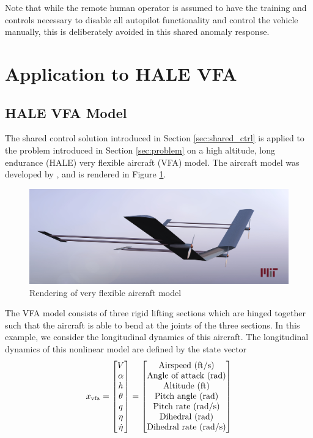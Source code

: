\documentclass[english]{ifacconf}
\begin{document}
Note that while the remote human operator is assumed to have the training and controls necessary to disable all autopilot functionality and control the vehicle manually, this is deliberately avoided in this shared anomaly response. 

\section{Application to HALE VFA} \label{sec:vfa}
\subsection{HALE VFA Model}
The shared control solution introduced in Section \ref{sec:shared_ctrl} is applied to the problem introduced in Section \ref{sec:problem} on a high altitude, long endurance (HALE) very flexible aircraft (VFA) model. The aircraft model was developed by \cite{gibson2011modeling}, and is rendered in Figure \ref{fig:vfa}. 
\begin{figure}[htbp]
	\centering
	\includegraphics[width=0.95\columnwidth]{../fig/VFA_16.jpg}
	\caption{Rendering of very flexible aircraft model}
	\label{fig:vfa}
\end{figure}

The VFA model consists of three rigid lifting sections which are hinged together such that the aircraft is able to bend at the joints of the three sections. In this example, we consider the longitudinal dynamics of this aircraft. The longitudinal dynamics of this nonlinear model are defined by the state vector
\begin{equation}
x_{\text{vfa}} = \begin{bmatrix}
V \\
\alpha \\
h \\
\theta \\
q\\
\eta\\
\dot{\eta}
\end{bmatrix} =
\begin{bmatrix}
	 $Airspeed (ft/s)$\\ $Angle of attack (rad)$\\ $Altitude (ft)$\\ $Pitch angle (rad)$\\ $Pitch rate (rad/s)$\\ $Dihedral (rad)$\\ $Dihedral rate (rad/s)$
\end{bmatrix}
\end{equation}
\end{document}
